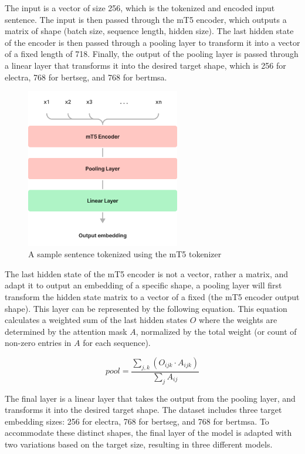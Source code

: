\documentclass[12.5pt]{article}
\begin{document}
The input is a vector of size 256, which is the tokenized and encoded input sentence. The input is then passed through the mT5 encoder, which outputs a matrix of shape (batch size, sequence length, hidden size). The last hidden state of the encoder is then passed through a pooling layer to transform it into a vector of a fixed length of 718. Finally, the output of the pooling layer is passed through a linear layer that transforms it into the desired target shape, which is 256 for electra, 768 for bertseg, and 768 for bertmsa.

\begin{figure}[H]
    \centering
    \captionsetup{justification=centering}
    \includegraphics[width=0.6\textwidth]{model-arch.png}
    \caption{A sample sentence tokenized using the mT5 tokenizer}
    \label{fig:model-arch}
\end{figure}

The last hidden state of the mT5 encoder is not a vector, rather a matrix, and adapt it to output an embedding of a specific shape, a pooling layer will first transform the hidden state matrix to a vector of a fixed (the mT5 encoder output shape). This layer can be represented by the following equation. This equation calculates a weighted sum of the last hidden states \(O\) where the weights are determined by the attention mask \(A\), normalized by the total weight (or count of non-zero entries in \(A\) for each sequence).

\begin{equation}
    pool = \frac{\sum_{j,k} (O_{ijk} \cdot A_{ijk})}{\sum_j A_{ij}}
\end{equation}

The final layer is a linear layer that takes the output from the pooling layer, and transforms it into the desired target shape. The dataset includes three target embedding sizes: 256 for electra, 768 for bertseg, and 768 for bertmsa. To accommodate these distinct shapes, the final layer of the model is adapted with two variations based on the target size, resulting in three different models.
\end{document}

